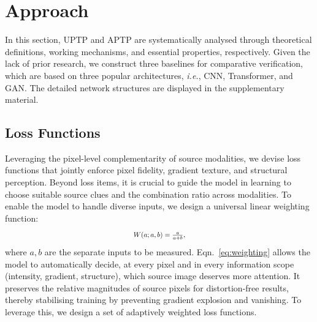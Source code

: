 \section{Approach}
In this section, UPTP and APTP are systematically analysed through theoretical definitions, working mechanisms, and essential properties, respectively. 
Given the lack of prior research, we construct three baselines for comparative verification, which are based on three popular architectures, \textit{i.e.}, CNN, Transformer, and GAN.
The detailed network structures are displayed in the supplementary material.
\subsection{Loss Functions}
Leveraging the pixel-level complementarity of source modalities, we devise loss functions that jointly enforce pixel fidelity, gradient texture, and structural perception. 
Beyond loss items, it is crucial to guide the model in learning to choose suitable source clues and the combination ratio across modalities. 
To enable the model to handle diverse inputs, we design a universal linear weighting function: 
\begin{equation}
    \scalebox{0.8}{$W(a;a,b) = \frac{a}{a+b},
    \label{eq:weighting}$}
\end{equation}
where $a, b$ are the separate inputs to be measured. 
Eqn.~\eqref{eq:weighting} allows the model to automatically decide, at every pixel and in every information scope (intensity, gradient, structure), which source image deserves more attention.  
It preserves the relative magnitudes of source pixels for distortion-free results, thereby stabilising training by preventing gradient explosion and vanishing. 
To leverage this, we design a set of adaptively weighted loss functions. 
\vspace{-1mm}
